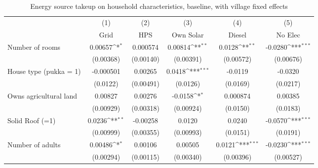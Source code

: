 \begin{table}[htbp]\centering
\def\sym#1{\ifmmode^{#1}\else\(^{#1}\)\fi}
\caption{Energy source takeup on household characteristics, baseline, with village fixed effects \label{tab: LABEL}}
\begin{tabular*}{1.0\hsize}{@{\hskip\tabcolsep\extracolsep\fill}l*{5}{c}}
\toprule
                                &\multicolumn{1}{c}{(1)}&\multicolumn{1}{c}{(2)}&\multicolumn{1}{c}{(3)}&\multicolumn{1}{c}{(4)}&\multicolumn{1}{c}{(5)}\\
                                &\multicolumn{1}{c}{Grid}&\multicolumn{1}{c}{HPS}&\multicolumn{1}{c}{Own Solar}&\multicolumn{1}{c}{Diesel}&\multicolumn{1}{c}{No Elec}\\
\midrule
Number of rooms                 &     0.00657\sym{*}  &    0.000574         &     0.00814\sym{**} &      0.0128\sym{**} &     -0.0280\sym{***}\\
                                &   (0.00368)         &   (0.00140)         &   (0.00391)         &   (0.00572)         &   (0.00676)         \\
\addlinespace
House type (pukka = 1)          &   -0.000501         &     0.00265         &      0.0418\sym{***}&     -0.0119         &     -0.0320         \\
                                &    (0.0122)         &   (0.00491)         &    (0.0126)         &    (0.0169)         &    (0.0217)         \\
\addlinespace
Owns agricultural land          &     0.00827         &     0.00276         &     -0.0158\sym{*}  &    0.000874         &     0.00385         \\
                                &   (0.00929)         &   (0.00318)         &   (0.00924)         &    (0.0150)         &    (0.0183)         \\
\addlinespace
Solid Roof (=1)                 &      0.0236\sym{**} &    -0.00258         &      0.0120         &      0.0240         &     -0.0570\sym{***}\\
                                &   (0.00999)         &   (0.00355)         &   (0.00993)         &    (0.0151)         &    (0.0191)         \\
\addlinespace
Number of adults                &     0.00486\sym{*}  &     0.00106         &     0.00505         &      0.0121\sym{***}&     -0.0230\sym{***}\\
                                &   (0.00294)         &   (0.00115)         &   (0.00340)         &   (0.00396)         &   (0.00527)         \\

\end{tabular*}
\end{table}
